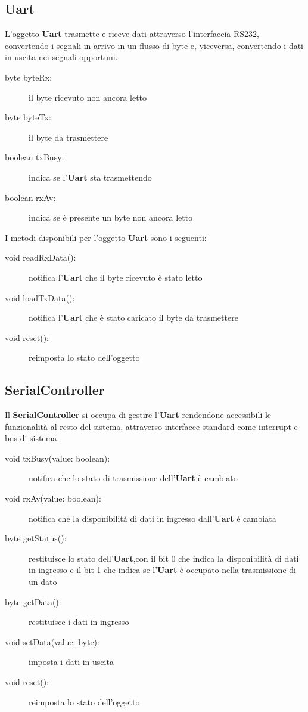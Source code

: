 \documentclass [11pt,a4paper,oneside]{paper}
\newcommand{\component}[1]{\textbf{#1}}
\begin{document}
\subsection{Uart}
L'oggetto \component{Uart} trasmette e riceve dati attraverso l'interfaccia RS232,
convertendo i segnali in arrivo in un flusso di byte e, viceversa, convertendo
i dati in uscita nei segnali opportuni.

\begin{description}
\item[byte byteRx:] il byte ricevuto non ancora letto
\item[byte byteTx:] il byte da trasmettere
\item[boolean txBusy:] indica se l'\component{Uart} sta trasmettendo
\item[boolean rxAv:] indica se è presente un byte non ancora letto
\end{description}

I metodi disponibili per l'oggetto \component{Uart} sono i seguenti:

\begin{description}
\item[void readRxData():] notifica l'\component{Uart} che il byte ricevuto è
    stato letto
\item[void loadTxData():] notifica l'\component{Uart} che è stato caricato il
    byte da trasmettere
\item[void reset():] reimposta lo stato dell'oggetto
\end{description}

\subsection{SerialController}
Il \component{SerialController} si occupa di gestire l'\component{Uart}
rendendone accessibili le funzionalità al resto del sistema,
attraverso interfacce standard come interrupt e bus di sistema.

\begin{description}
\item[void txBusy(value: boolean):] notifica che lo stato di trasmissione
    dell'\component{Uart} è cambiato
\item[void rxAv(value: boolean):] notifica che la disponibilità di dati
    in ingresso dall'\component{Uart} è cambiata
\item[byte getStatus():] restituisce lo stato dell'\component{Uart},con il
    bit 0 che indica la disponibilità di dati in ingresso e il bit 1 che
    indica se l'\component{Uart} è occupato nella trasmissione di un dato
\item[byte getData():] restituisce i dati in ingresso
\item[void setData(value: byte):] imposta i dati in uscita
\item[void reset():] reimposta lo stato dell'oggetto
\end{description}
\end{document}
